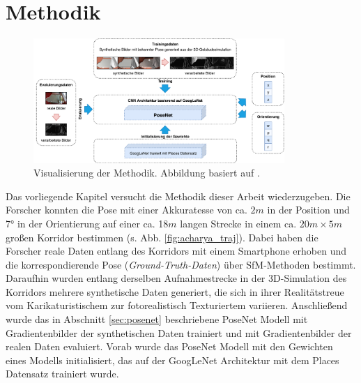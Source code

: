 
\section{Methodik}

\begin{figure}[t]
	\centering
	\includegraphics[width=0.85\textwidth]{images/methodik/methodik.pdf}
	\caption{Visualisierung der Methodik. Abbildung basiert auf \cite{acharyaBIMPoseNetIndoorCamera2019}.}
	\label{fig:methodik}
\end{figure}

Das vorliegende Kapitel versucht die Methodik dieser Arbeit wiederzugeben. Die Forscher \citet{acharyaBIMPoseNetIndoorCamera2019} konnten die Pose mit einer Akkuratesse von ca. $2m$ in der Position und 7° in der Orientierung auf einer ca. 18$m$ langen Strecke in einem ca. $20m \times 5m$ großen Korridor bestimmen (s. Abb. \ref{fig:acharya_traj}). Dabei haben die Forscher reale Daten entlang des Korridors mit einem Smartphone erhoben und die korrespondierende Pose (\textit{Ground-Truth-Daten}) über SfM-Methoden bestimmt. Daraufhin wurden entlang derselben Aufnahmestrecke in der 3D-Simulation des Korridors mehrere synthetische Daten generiert, die sich in ihrer Realitätstreue vom Karikaturistischem zur fotorealistisch Texturiertem variieren. Anschließend wurde das in Abschnitt \ref{sec:posenet} beschriebene PoseNet Modell mit Gradientenbilder der synthetischen Daten trainiert und mit Gradientenbilder der realen Daten evaluiert. Vorab wurde das PoseNet Modell mit den Gewichten eines Modells initialisiert, das auf der GoogLeNet Architektur mit dem Places Datensatz \cite{zhouLearningDeepFeatures2014} trainiert wurde. 

